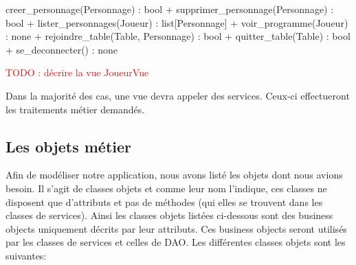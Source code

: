 \documentclass[11pt]{article}
\begin{document}
creer\_personnage(Personnage) : bool
+ supprimer\_personnage(Personnage) : bool
+ lister\_personnages(Joueur) : list[Personnage]
+ voir\_programme(Joueur) : none
+ rejoindre\_table(Table, Personnage) : bool
+ quitter\_table(Table) : bool
+ se\_deconnecter() : none






\textcolor{red}{TODO : décrire la vue JoueurVue}






\bigbreak
Dans la majorité des cas, une vue devra appeler des services. Ceux-ci effectueront les traitements métier demandés.


\subsection{Les objets métier}

Afin de modéliser notre application, nous avons listé les objets dont nous avions besoin. Il s’agit de classes objets et comme leur nom l’indique, ces classes ne disposent que d’attributs et pas de méthodes (qui elles se trouvent dans les classes de services). Ainsi les classes objets listées ci-dessous sont des business objects uniquement décrits par leur attributs. Ces business objects seront utilisés par les classes de services et celles de DAO. Les différentes classes objets sont les suivantes:

\bigbreak
\end{document}
